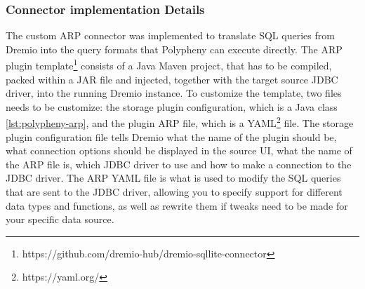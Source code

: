 \subsubsection{Connector implementation Details}
The custom \ac{ARP} connector was implemented to translate \ac{SQL} queries from Dremio into the query formats that Polypheny can execute directly.
The \ac{ARP} plugin template\footnote{https://github.com/dremio-hub/dremio-sqllite-connector} consists of a Java Maven project, that has to be compiled, packed within a \ac{JAR} file and injected, together with the target source \ac{JDBC} driver, into the running Dremio instance.
To customize the template, two files needs to be customize: the storage plugin configuration, which is a Java class \ref{lst:polypheny-arp}, and the plugin \ac{ARP} file, which is a YAML\footnote{https://yaml.org/} file.
The storage plugin configuration file tells Dremio what the name of the plugin should be, what connection options should be displayed in the source UI, what the name of the \ac{ARP} file is, which \ac{JDBC} driver to use and how to make a connection to the \ac{JDBC} driver.
The \ac{ARP} YAML file is what is used to modify the \ac{SQL} queries that are sent to the \ac{JDBC} driver, allowing you to specify support for different data types and functions, as well as rewrite them if tweaks need to be made for your specific data source. 

